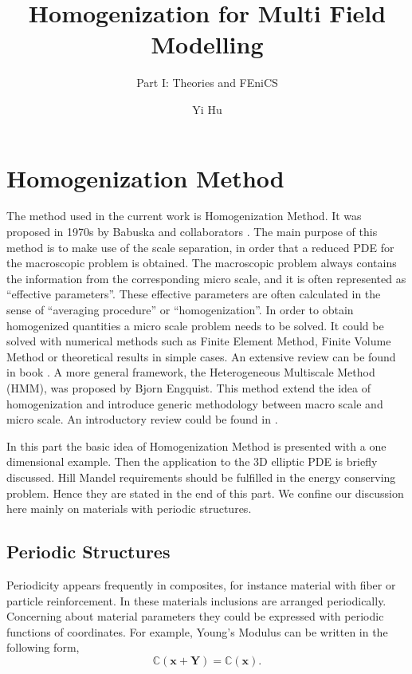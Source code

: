 \documentclass[10pt,a4paper]{scrreprt}
\author{Yi Hu}
\title{Homogenization for Multi Field Modelling}
\subtitle{Part I: Theories and FEniCS}
\begin{document}
\chapter{Homogenization Method}
The method used in the current work is Homogenization Method. It was proposed in 1970s by Babuska and collaborators \citep{EPFL-ARTICLE-184958}. The main purpose of this method is to make use of the scale separation, in order that a reduced PDE for the macroscopic problem is obtained. The macroscopic problem always contains the information from the corresponding micro scale, and it is often represented as ``effective parameters''. These effective parameters are often calculated in the sense of ``averaging procedure'' or ``homogenization''. In order to obtain homogenized quantities a micro scale problem needs to be solved. It could be solved with numerical methods such as Finite Element Method, Finite Volume Method or theoretical results in simple cases. An extensive review  can be found in book \citep{efendiev2009multiscale}. A more general framework, the Heterogeneous Multiscale Method (HMM), was proposed by Bjorn Engquist. This method extend the idea of homogenization and introduce generic methodology between macro scale and micro scale. An introductory review could be found in \citep{weinan2007heterogeneous}.

In this part the basic idea of Homogenization Method is presented with a one dimensional example. Then the application to the 3D elliptic PDE is briefly discussed. Hill Mandel requirements should be fulfilled in the energy conserving problem. Hence they are stated in the end of this part. We confine our discussion here mainly on materials with periodic structures. 

\section{Periodic Structures}
Periodicity appears frequently in composites, for instance material with fiber or particle reinforcement. In these materials inclusions are arranged periodically. Concerning about material parameters they could be expressed with periodic functions of coordinates. For example, Young's Modulus can be written in the following form,
%
\begin{equation}
\label{eq:periodic 1}
\mathbb{C}(\mathbf{x}+\mathbf{Y}) = \mathbb{C}(\mathbf{x}).
\end{equation}
%
\end{document}
